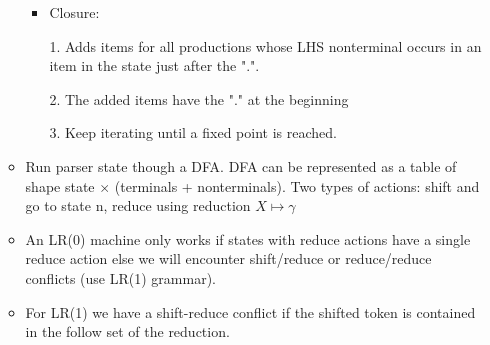\begin{itemize}
\begin{itemize}
\begin{itemize}
			\item Closure:
			
			1. Adds items for all productions whose LHS nonterminal occurs in an item in the state just after the ".".
			
			2. The added items have the "." at the beginning 
		
			3. Keep iterating until a fixed point is reached.
		\end{itemize} 
		
		\item Run parser state though a DFA. DFA can be represented as a table of shape state $\times$ (terminals + nonterminals). Two types of actions: shift and go to state n, reduce using reduction $X \mapsto \gamma$
		
		\item An LR(0) machine only works if states with reduce actions have a single reduce action else we will encounter shift/reduce or reduce/reduce conflicts (use LR(1) grammar).
		
		\item For LR(1) we have a shift-reduce conflict if the shifted token is contained in the follow set of the reduction.
	\end{itemize}
\end{itemize}



